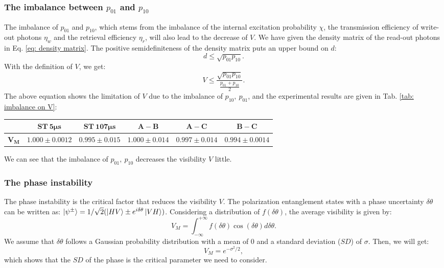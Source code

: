 \documentclass[aps,reprint,showpacs,superscriptaddress]{revtex4-2}
\begin{document}
\subsubsection{The imbalance between $p_{01}$ and $p_{10}$ }
The imbalance  of $p_{01}$ and $p_{10}$, which stems from the imbalance of the internal excitation probability $\chi$, the transmission efficiency of write-out photons $\eta_w$ and the retrieval efficiency $\eta_r$,  will also lead to the decrease of $V$. We have given the density matrix of the read-out photons in Eq. \ref{eq: density matrix}. The positive semidefiniteness of the density matrix puts an upper bound on $d$:
\begin{equation}
	d\le \sqrt{p_{01}p_{10}}.
\end{equation}
With the definition of $V$, we get:
\begin{equation}
	V\le \frac{\sqrt{p_{01}p_{10}}}{\frac{p_{01}+p_{10}}{2}}.
\end{equation}
The above equation shows the limitation of $V$ due to the imbalance of $p_{10},\ p_{01}$, and the experimental results are given in Tab. \ref{tab: imbalance on V}:
\begin{table*}[!htbp]
	\caption{$V_M$ under the imbalance of $p_{10},\ p_{01}$}
	\label{tab: imbalance on V}
	\renewcommand\arraystretch{1.2}
	\begin{ruledtabular}
	\begin{tabular}{cccccc}
		& $\bm{ST\  5\mu s}$ &  $\bm{ST \ 107\mu s}$ & $\bm{A-B}$& $\bm{A-C}$ & $\bm{B-C}$\\
		\hline
		$\bm{V_M}$ &$1.000\pm0.0012$&$0.995\pm 0.015$&$1.000\pm0.014$&$0.997\pm0.014$&$0.994\pm0.0014$\\
	\end{tabular}
\end{ruledtabular}
\end{table*}

We can see that the imbalance of $p_{01},\ p_{10}$ decreases the visibility $V$ little.

\subsubsection{The phase instability}

The phase instability is the critical factor that reduces the visibility $V$. The polarization entanglement states with a phase uncertainty $\delta \theta$ can be written as: $\ket{\psi^\pm}=1/\sqrt{2}(\ket{HV}\pm e^{i\delta \theta}\ket{VH})$. Considering a distribution of $f(\delta \theta)$, the average visibility is given by:
\begin{equation}
	V_M=\int_{-\infty}^{+\infty}f(\delta \theta)\cos(\delta \theta) d\delta \theta.
\end{equation}
We assume that $\delta \theta$ follows a Gaussian probability distribution with a mean of 0 and  a standard deviation ($SD$) of $\sigma$.  Then, we will get:
\begin{equation}
	V_M=e^{-\sigma^2/2},
	\label{eq: SD and VM}
\end{equation}
 which shows that the $SD$ of the phase is the critical parameter we need to consider.
\end{document}
